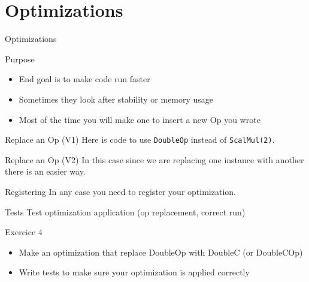 \documentclass[utf8x]{beamer}
\newcommand{\code}[1]{\lstinline[emph={[2]}]|#1|}
\begin{document}
\section{Optimizations}

\begin{frame}[plain]{}
\begin{center}
\Huge Optimizations
\end{center}
\end{frame}

\begin{frame}{Purpose}
\begin{itemize}
\item End goal is to make code run faster
\item Sometimes they look after stability or memory usage
\item Most of the time you will make one to insert a new Op you wrote
\end{itemize}
\end{frame}

\begin{frame}{Replace an Op (V1)}
Here is code to use \code{DoubleOp} instead of \code{ScalMul(2)}.

\end{frame}

\begin{frame}{Replace an Op (V2)}
In this case since we are replacing one instance with another there is an easier way.

\end{frame}

\begin{frame}{Registering}
In any case you need to register your optimization.


\end{frame}

\begin{frame}{Tests}
\color{red}Test optimization application (op replacement, correct run)
\end{frame}

\begin{frame}{Exercice 4}
\begin{itemize}
\item Make an optimization that replace DoubleOp with DoubleC (or DoubleCOp)
\item Write tests to make sure your optimization is applied correctly
\end{itemize}
\end{frame}
\end{document}
